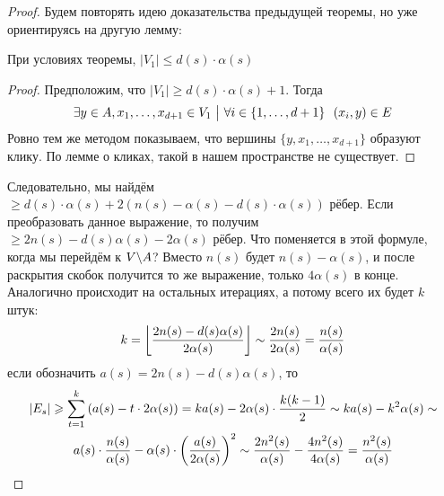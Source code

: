\begin{proof}
	Будем повторять идею доказательства предыдущей теоремы, но уже ориентируясь на другую лемму:
	\begin{lemma}
		При условиях теоремы, $|V_1| \le d(s) \cdot \alpha(s)$
	\end{lemma}

	\begin{proof}
		Предположим, что $|V_1| \ge d(s) \cdot \alpha(s) + 1$. Тогда
		\[
			\exists y \in A, x_1, \ldots, x_{d + 1} \in V_1 \ \big|\  \forall i \in \{1, \ldots, d + 1\}\ \ (x_i, y) \in E
		\]
		Ровно тем же методом показываем, что вершины $\{y, x_1, \ldots, x_{d + 1}\}$ образуют клику. По лемме о кликах, такой в нашем пространстве не существует.
	\end{proof}
	
	Следовательно, мы найдём $\ge d(s) \cdot \alpha(s) + 2(n(s) - \alpha(s) - d(s) \cdot \alpha(s))$ рёбер. Если преобразовать данное выражение, то получим $\ge 2n(s) - d(s)\alpha(s) - 2\alpha(s)$ рёбер. Что поменяется в этой формуле, когда мы перейдём к $V \backslash A$? Вместо $n(s)$ будет $n(s) - \alpha(s)$, и после раскрытия скобок получится то же выражение, только $4\alpha(s)$ в конце. Аналогично происходит на остальных итерациях, а потому всего их будет $k$ штук:
	\[
		k = \left\lfloor \frac{2n(s) - d(s)\alpha(s)}{2\alpha(s)} \right\rfloor \sim \frac{2n(s)}{2\alpha(s)} = \frac{n(s)}{\alpha(s)}
	\]
	если обозначить $a(s) = 2n(s) - d(s)\alpha(s)$, то
	\begin{multline*}
		|E_s| \geqslant \sum_{t = 1}^k \left(a(s) - t \cdot 2\alpha(s)\right) = ka(s) - 2\alpha(s) \cdot \frac{k(k - 1)}{2} \sim ka(s) - k^2\alpha(s) \sim
		\\
		a(s) \cdot \frac{n(s)}{\alpha(s)} - \alpha(s) \cdot \left(\frac{a(s)}{2\alpha(s)}\right)^2 \sim \frac{2n^2(s)}{\alpha(s)} - \frac{4n^2(s)}{4\alpha(s)} = \frac{n^2(s)}{\alpha(s)}
	\end{multline*}
\end{proof}

